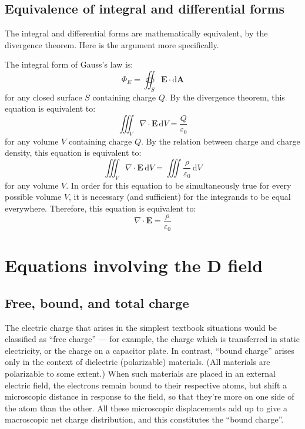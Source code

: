 \documentclass[a4paper, 12pt]{article}
\begin{document}
\subsection{Equivalence of integral and differential forms}
The integral and differential forms are mathematically equivalent, by the divergence theorem. Here is the argument more specifically.

\begin{mdframed}[%
    style=mystyle,%
    frametitle={Outline of proof}]

The integral form of Gauss's law is:
\[
    \Phi_E = \oiint_S \mathbf{E} \cdot \mathrm{d} \mathbf{A}
\]
for any closed surface \(S\) containing charge \(Q\). By the divergence theorem, this equation is equivalent to: 
\[
    \iiint_V \nabla \cdot \mathbf{E} \, \mathrm{d}V  = \frac{Q}{\varepsilon_0}
\]
for any volume \(V\) containing charge \(Q\). By the relation between charge and charge density, this equation is equivalent to: 
\[
    \iiint_V \nabla \cdot \mathbf{E} \, \mathrm{d}V  = \iiint \frac{\rho}{\varepsilon_0} \, \mathrm{d}V
\]
for any volume \(V\). In order for this equation to be simultaneously true for every possible volume \(V\), it is necessary (and sufficient) for the integrands to be equal everywhere. Therefore, this equation is equivalent to: 
\[
    \nabla \cdot \mathbf{E} = \frac{\rho}{\varepsilon_0}
\]
\end{mdframed}

\section{Equations involving the \(\mathbf{D}\) field}
\subsection{Free, bound, and total charge}
The electric charge that arises in the simplest textbook situations would be classified as ``free charge'' --- for example, the charge which is transferred in static electricity, or the charge on a capacitor plate. In contrast, ``bound charge'' arises only in the context of dielectric (polarizable) materials. (All materials are polarizable to some extent.) When such materials are placed in an external electric field, the electrons remain bound to their respective atoms, but shift a microscopic distance in response to the field, so that they're more on one side of the atom than the other. All these microscopic displacements add up to give a macroscopic net charge distribution, and this constitutes the ``bound charge''. 
\end{document}
